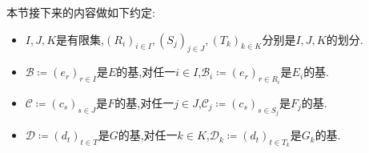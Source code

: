 本节接下来的内容做如下约定:

\begin{itemize}
	\item $I,J,K$是有限集,$\left(R_{i}\right)_{i\in I},\left(S_{j}\right)_{j\in J},\left(T_{k}\right)_{k\in K}$分别是$I,J,K$的划分.
	\item $\mathcal{B}\coloneq\left(e_{r}\right)_{r\in I}$是$E$的基,对任一$i\in I$,$\mathcal{B}_{i}\coloneq\left(e_{r}\right)_{r\in R_{i}}$是$E_{i}$的基.
	\item $\mathcal{C}\coloneq\left(c_{s}\right)_{s\in J}$是$F$的基,对任一$j\in J$,$\mathcal{C}_{j}\coloneq\left(c_{s}\right)_{s\in S_{j}}$是$F_{j}$的基.
	\item $\mathcal{D}\coloneq\left(d_{t}\right)_{t\in T}$是$G$的基,对任一$k\in K$,$\mathcal{D}_{k}\coloneq\left(d_{t}\right)_{t\in T_{k}}$是$G_{k}$的基.
\end{itemize}

